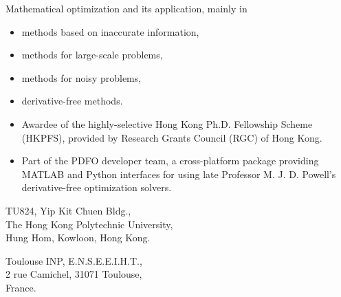 Mathematical optimization and its application, mainly in
\begin{itemize}
    \item methods based on inaccurate information,
    \item methods for large-scale problems,
    \item methods for noisy problems,
    \item derivative-free methods.
\end{itemize}


\cvtag{\LaTeX}


\begin{itemize}
    \item Awardee of the highly-selective Hong Kong Ph.D. Fellowship Scheme (HKPFS), provided by Research Grants Council (RGC) of Hong Kong.
    \item Part of the PDFO developer team, a cross-platform package providing MATLAB and Python interfaces for using late Professor M. J. D. Powell's derivative-free optimization solvers.
\end{itemize}

\medskip


{TU824, Yip Kit Chuen Bldg., \\The Hong Kong Polytechnic University, \\ Hung Hom, Kowloon, Hong Kong.}

\divider

{Toulouse INP, E.N.S.E.E.I.H.T.,\\ 2 rue Camichel, 31071 Toulouse, \\France.}
